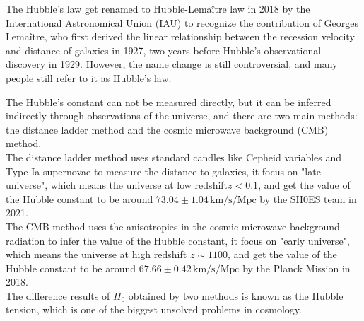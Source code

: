 \bigskip\noindent
\begin{extra}
    The Hubble's law get renamed to Hubble-Lemaître law in 2018 by the International Astronomical Union (IAU) to recognize the contribution of Georges Lemaître, who first derived the linear relationship between the recession velocity and distance of galaxies in 1927, two years before Hubble's observational discovery in 1929. However, the name change is still controversial, and many people still refer to it as Hubble's law. 
\end{extra}

\bigskip\noindent
\begin{extra}
    The Hubble's constant can not be measured directly, but it can be inferred indirectly through observations of the universe, and there are two main methods: the distance ladder method and the cosmic microwave background (CMB) method. \\

    The distance ladder method uses standard candles like Cepheid variables and Type Ia supernovae to measure the distance to galaxies, it focus on "late universe", which means the universe at low redshift$z < 0.1$, and get the value of the Hubble constant to be around $73.04 \pm 1.04 \, \mathrm{km/s/Mpc}$ by the SH0ES team in 2021. \\

    The CMB method uses the anisotropies in the cosmic microwave background radiation to infer the value of the Hubble constant, it focus on "early universe", which means the universe at high redshift $z \sim 1100$, and get the value of the Hubble constant to be around $67.66 \pm 0.42 \, \mathrm{km/s/Mpc}$ by the Planck Mission in 2018. \\

    The difference results of $H_0$ obtained by two methods is known as the Hubble tension, which is one of the biggest unsolved problems in cosmology.
\end{extra}


\clearpage
